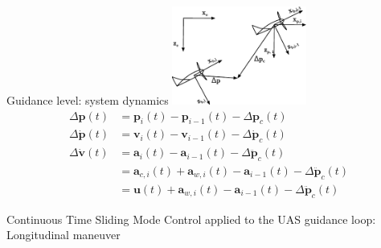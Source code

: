 \documentclass[]{beamer}
\newcommand{\mbf}[1]{\mathbf{#1}}
\providecommand{\mbf}[1]{\mathbf{#1}}
\newcommand{\idxFollower}{{\ensuremath{i} }}
\newcommand{\idxPredecessor}{{\ensuremath{i-1} }}
\begin{document}
\begin{frame}{Guidance level: system dynamics}
\centering
\includegraphics[width=4.4cm]{frames.pdf}    %
\begin{align}
\Delta \mbf{p}(t) &= \mbf{p}_\idxFollower(t) - \mbf{p}_\idxPredecessor(t) - \Delta \mbf{p}_c(t)  \nonumber \\
\Delta \dot{\mbf{p}}(t) &= \mbf{v}_{\idxFollower}(t) - \mbf{v}_{\idxPredecessor}(t) -  \Delta \dot{\mbf{p}}_c(t) \nonumber \\
\Delta \dot{\mbf{v}}(t) &= \mbf{a}_\idxFollower(t) - \mbf{a}_\idxPredecessor(t) -  \Delta \ddot{\mbf{p}}_c(t) \nonumber \\
{} &= \mbf{a}_{c,\idxFollower}(t) + \mbf{a}_{w,\idxFollower}(t)
 - \mbf{a}_\idxPredecessor(t) -  \Delta \ddot{\mbf{p}}_c(t) \nonumber \\
{} &= \mbf{u}(t) + \mbf{a}_{w,\idxFollower}(t)
 - \mbf{a}_\idxPredecessor(t) -  \Delta \ddot{\mbf{p}}_c(t) \nonumber
\end{align}
\end{frame}

\usebackgroundtemplate{}
\begin{frame}
\Large
\vspace{3em}
\begin{center}
Continuous Time Sliding Mode Control applied to the UAS guidance loop:\\
Longitudinal maneuver
\end{center}
\end{frame}
\end{document}

